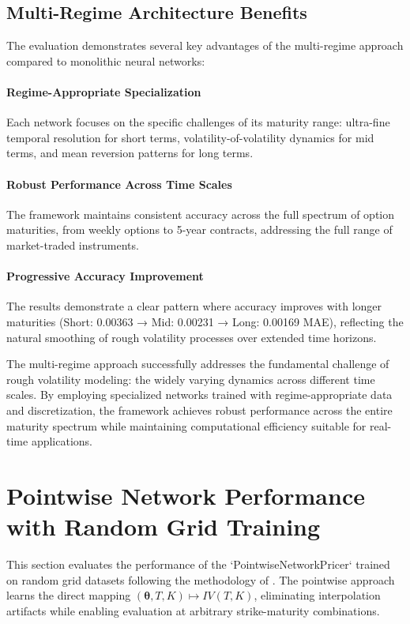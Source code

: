 	\subsection{Multi-Regime Architecture Benefits}
	
	The evaluation demonstrates several key advantages of the multi-regime approach compared to monolithic neural networks:
	
	\paragraph{Regime-Appropriate Specialization}
	Each network focuses on the specific challenges of its maturity range: ultra-fine temporal resolution for short terms, volatility-of-volatility dynamics for mid terms, and mean reversion patterns for long terms.
	
	\paragraph{Robust Performance Across Time Scales}
	The framework maintains consistent accuracy across the full spectrum of option maturities, from weekly options to 5-year contracts, addressing the full range of market-traded instruments.
	
	\paragraph{Progressive Accuracy Improvement}
	The results demonstrate a clear pattern where accuracy improves with longer maturities (Short: 0.00363 → Mid: 0.00231 → Long: 0.00169 MAE), reflecting the natural smoothing of rough volatility processes over extended time horizons.
	
	The multi-regime approach successfully addresses the fundamental challenge of rough volatility modeling: the widely varying dynamics across different time scales. By employing specialized networks trained with regime-appropriate data and discretization, the framework achieves robust performance across the entire maturity spectrum while maintaining computational efficiency suitable for real-time applications.
						
	\section{Pointwise Network Performance with Random Grid Training}
	\label{sec:pointwise-results}
	
	This section evaluates the performance of the `PointwiseNetworkPricer` trained on random grid datasets following the methodology of \citet{Baschetti2024DeepCalibrationRandomGrids}. The pointwise approach learns the direct mapping $(\boldsymbol{\theta}, T, K) \mapsto IV(T, K)$, eliminating interpolation artifacts while enabling evaluation at arbitrary strike-maturity combinations.
	
